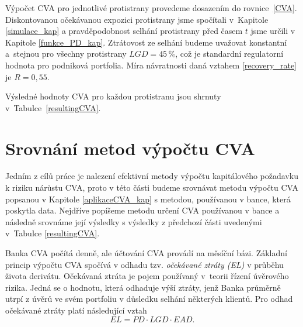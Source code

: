\documentclass[a4paper,12pt]{report}
\theoremstyle{definition} \newtheorem{definice}[veta]{Definice}
\theoremstyle{remark}
\begin{document}
Výpočet CVA pro jednotlivé protistrany provedeme dosazením do rovnice~\eqref{CVA}. 
Diskontovanou očekávanou expozici protistrany jsme spočítali v~Kapitole \ref{simulace_kap} a pravděpodobnost selhání protistrany před časem $t$ jsme určili v Kapitole \ref{funkce_PD_kap}.
Ztrátovost ze selhání budeme uvažovat konstantní a~stejnou pro všechny protistrany $LGD=45\,\%$, což je standardní regulatorní hodnota pro podniková portfolia. 
Míra návratnosti daná vztahem \eqref{recovery_rate} je $R=0,55$.

Výsledné hodnoty CVA pro každou protistranu jsou shrnuty v~Tabulce~\ref{resultingCVA}.
\begin{table}%
  \centering 
\caption{Přehled výsledků CVA pro jednotlivé protistrany}
\label{resultingCVA}
\vspace{5mm}
\end{table}



\section{Srovnání metod výpočtu CVA}\label{srovnani_metod_cva}
Jedním z cílů práce je nalezení efektivní metody výpočtu kapitálového požadavku k riziku nárůstu CVA, proto v této části budeme srovnávat metodu výpočtu CVA popsanou v Kapitole \ref{aplikaceCVA_kap} s metodou, používanou v bance, která poskytla data.
Nejdříve popíšeme metodu určení CVA používanou v bance a následně srovnáme její výsledky s výsledky z předchozí části uvedenými v~Tabulce \ref{resultingCVA}. 

Banka CVA počítá denně, ale účtování CVA provádí na měsíční bázi.
Základní princip výpočtu CVA spočívá v odhadu tzv. \textit{očekávané ztráty (EL)} v průběhu života derivátu. 
Očekávaná ztráta je pojem používaný v~teorii řízení úvěrového rizika.
Jedná se o hodnotu, která odhaduje výší ztráty, jenž Banka průměrně utrpí z úvěrů ve svém portfoliu v důsledku selhání některých klientů. 
Pro odhad očekávané ztráty platí následující vztah 
\begin{equation}\label{el}
EL=PD\cdot LGD\cdot EAD.
\end{equation}
\end{document}
